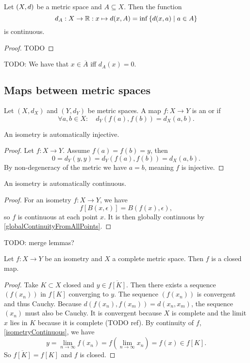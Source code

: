 \begin{proposition} \label{distanceToSetContinuous}
Let $\left( X,d \right)$ be a metric space and $A\subseteq X$. Then the function
\[ d_A: X\to \mathbb{R}: x\mapsto d(x,A) = \inf\left\{ d(x,a) \;\middle|\; a\in A \right\} \]
is continuous.
\end{proposition}
\begin{proof}
TODO
\end{proof}
TODO: We have that $x\in \overline{A}$ iff $d_A(x) = 0$.

\subsection{Maps between metric spaces}
\begin{definition}
Let $(X,d_X)$ and $(Y,d_Y)$ be metric spaces. A map $f:X\to Y$ is an  or  if
\[ \forall a,b \in X: \quad d_Y(f(a),f(b)) = d_X(a,b). \]
\end{definition}
\begin{lemma} \label{isometryInjective}
An isometry is automatically injective.
\end{lemma}
\begin{proof}
Let $f: X\to Y$. Assume $f(a) = f(b) = y$, then
\[ 0 = d_Y(y,y) = d_Y(f(a),f(b)) = d_X(a,b). \]
By non-degeneracy of the metric we have $a=b$, meaning $f$ is injective.
\end{proof}
\begin{lemma} \label{isometryContinuous}
An isometry is automatically continuous.
\end{lemma}
\begin{proof}
For an isometry $f:X\to Y$, we have
\[ f[B(x,\epsilon)] = B(f(x),\epsilon), \]
so $f$ is continuous at each point $x$. It is then globally continuous by \ref{globalContinuityFromAllPoints}.
\end{proof}
TODO: merge lemmas?

\begin{lemma} \label{isometryClosed}
Let $f:X\to Y$ be an isometry and $X$ a complete metric space. Then $f$ is a closed map.
\end{lemma}
\begin{proof}
Take $K\subset X$ closed and $y\in\overline{f[K]}$. Then there exists a sequence $(f(x_n))$ in $f[K]$ converging to $y$. The sequence $(f(x_n))$ is convergent and thus Cauchy. Because $d(f(x_n), f(x_m)) = d(x_n,x_m)$, the sequence $(x_n)$ must also be Cauchy. It is convergent because $X$ is complete and the limit $x$ lies in $K$ because it is complete (TODO ref). By continuity of $f$, \ref{isometryContinuous}, we have
\[ y = \lim_{n\to\infty} f(x_n) = f(\lim_{n\to\infty}x_n) = f(x) \in f[K]. \]
So $\overline{f[K]} = f[K]$ and $f$ is closed.
\end{proof}

